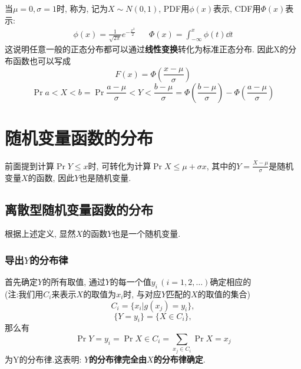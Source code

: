当$\mu=0, \sigma=1$时, 称为, 记为$X\sim N(0, 1)$, PDF用$\phi(x )$表示, CDF用$\Phi(x )$表示:
\begin{align}
    \phi(x ) = \frac{1}{\sqrt{2\pi}}e^{-\frac{x^2}{2}} &  & \Phi(x ) = \int_{-\infty}^{x}\phi(t)\dd{t}
    \label{eq:2.13}
\end{align}
这说明任意一般的正态分布都可以通过\textbf{线性变换}转化为标准正态分布.
因此X的分布函数也可以写成
\[F(x) = \Phi\left(\frac{x-\mu}{\sigma}\right)\]
\[\Pr{a<X<b}= \Pr{\frac{a-\mu}{\sigma}<Y<\frac{b-\mu}{\sigma}} = \Phi\left(\frac{b-\mu}{\sigma}\right) - \Phi\left(\frac{a-\mu}{\sigma}\right)\]
\section{随机变量函数的分布}
前面提到计算$\Pr{Y\leq x}$时, 可转化为计算$\Pr{X\leq \mu + \sigma x}$, 其中的$Y=\frac{X-\mu}{\sigma}$是随机变量$X$的函数, 因此$Y$也是随机变量.
\subsection{离散型随机变量函数的分布}
根据上述定义, 显然$X$的函数$Y$也是一个随机变量.
\subsubsection{导出$Y$的分布律}
首先确定$Y$的所有取值, 通过$Y$的每一个值$y_i\, (i=1, 2, \ldots)$确定相应的\\
(注:我们用$C_i$来表示$X$的取值为$x_i$时, 与对应$Y$匹配的$X$的取值的集合)
\begin{equation*}
    C_i=\{x_i | g(x_j) = y_i\},
\end{equation*}
\begin{equation*}
    \{Y=y_i\}=\{X\in C_i\},
\end{equation*}
那么有\\
\begin{equation}
    \Pr{Y=y_i} = \Pr{X\in C_i } = \sum_{x_j \in C_i }\Pr{X=x_j} \label{eq:2.14}
\end{equation}
为Y的分布律.这表明: \textbf{$Y$的分布律完全由$X$的分布律确定}.
